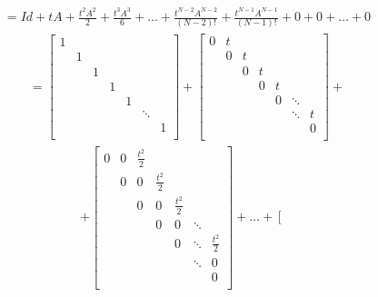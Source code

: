 \documentclass[letterpaper,10pt,english]{jupyterBook}
\begin{document}
\begin{equation*}
\begin{split}
    = Id + tA + \frac{t^2 A^2}{2} + \frac{t^3 A^3}{6} + \dotsc + \frac{t^{N-2} A^{N-2}}{(N-2)!} + \frac{t^{N-1} A^{N-1}}{(N-1)!} + 0 + 0 + \dotsc + 0
\end{split}
\end{equation*}\begin{equation*}
\begin{split}
    = \left[ {\begin{array}{ccccccc}
    1 &  &  &  &  &  & \\
     & 1 &  &  &  &  &\\
     &  & 1 &  &  &  &\\
     &  &  & 1 &  &  &\\
     &  &  &  & 1 &  &\\
     &  &  &  &  & \ddots &\\
     &  &  &  &  &  & 1 \\
\end{array} } \right] + \left[ {\begin{array}{ccccccc}
    0 & t &  &  &  &  & \\
     & 0 & t &  &  &  &\\
     &  & 0 & t &  &  &\\
     &  &  & 0 & t &  &\\
     &  &  &  & 0 & \ddots &  \\
     &  &  &  &  & \ddots & t \\
     &  &  &  &  &  & 0 \\
\end{array} } \right] + 
\end{split}
\end{equation*}\begin{equation*}
\begin{split}
+ \left[ {\begin{array}{ccccccc}
    0 & 0 & \frac{t^2}{2} &  &  &  & \\
     & 0 & 0 & \frac{t^2}{2} &  &  &\\
     &  & 0 & 0 & \frac{t^2}{2} &  &\\
     &  &  & 0 & 0 & \ddots &\\
     &  &  &  & 0 & \ddots & \frac{t^2}{2} \\
     &  &  &  &  & \ddots & 0 \\
     &  &  &  &  &  & 0 \\
\end{array} } \right] + \dotsc + \left[ {\begin{array}{ccccccc}

\end{array}}
\end{split}
\end{equation*}
\end{document}
